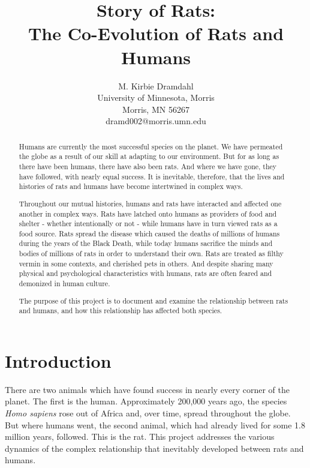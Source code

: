 \documentclass[12pt]{article}
\title{Story of Rats:\\
       The Co-Evolution of Rats and Humans}
\author{
 		M. Kirbie Dramdahl\\
        University of Minnesota, Morris\\
        Morris, MN 56267\\
        dramd002@morris.umn.edu\\
}
\date{}
\begin{document}
\pagestyle{plain}

\maketitle

\begin{abstract}

Humans are currently the most successful species on the planet. We have permeated the globe as a result of our skill at adapting to our environment. But for as long as there have been humans, there have also been rats. And where we have gone, they have followed, with nearly equal success. It is inevitable, therefore, that the lives and histories of rats and humans have become intertwined in complex ways.

Throughout our mutual histories, humans and rats have interacted and affected one another in complex ways. Rats have latched onto humans as providers of food and shelter - whether intentionally or not - while humans have in turn viewed rats as a food source. Rats spread the disease which caused the deaths of millions of humans during the years of the Black Death, while today humans sacrifice the minds and bodies of millions of rats in order to understand their own. Rats are treated as filthy vermin in some contexts, and cherished pets in others. And despite sharing many physical and psychological characteristics with humans, rats are often feared and demonized in human culture.

The purpose of this project is to document and examine the relationship between rats and humans, and how this relationship has affected both species.

\pagebreak

\end{abstract}

\section{Introduction} \label{Introduction}

There are two animals which have found success in nearly every corner of the planet. The first is the human. Approximately 200,000 years ago, the species \textit{Homo sapiens} rose out of Africa and, over time, spread throughout the globe. But where humans went, the second animal, which had already lived for some 1.8 million years, followed. This is the rat. This project addresses the various dynamics of the complex relationship that inevitably developed between rats and humans.
\end{document}
